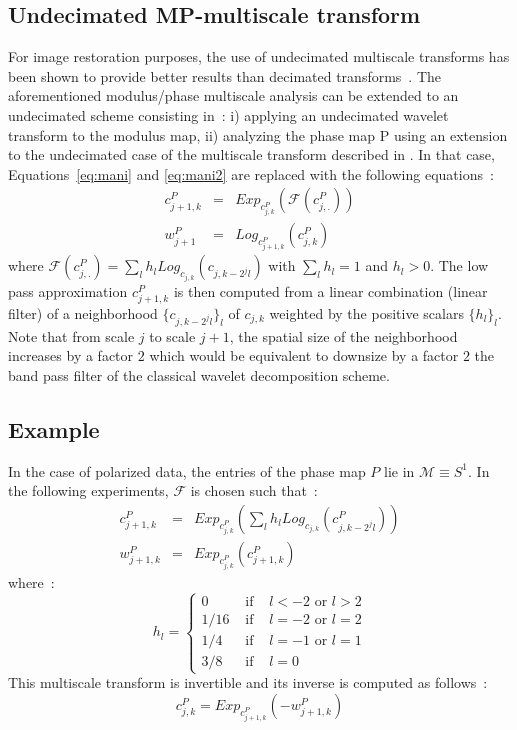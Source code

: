 \subsection{Undecimated MP-multiscale transform}
For image restoration purposes, the use of undecimated multiscale transforms has been shown to provide better results than decimated transforms~\cite{starck:book98,starck:book06}. 
The aforementioned modulus/phase multiscale analysis can be extended to an undecimated scheme consisting in~: i) applying an undecimated wavelet transform to the modulus map, 
ii) analyzing the phase map P using an extension to the undecimated case of the multiscale transform described in \cite{rahman05}. In that case, Equations~\eqref{eq:mani} 
and \eqref{eq:mani2} are replaced with the following equations~:
\begin{eqnarray}\label{eq:maniu}
c_{j+1,k}^P & = & Exp_{c_{j,k}^P} ( \mathcal{F}(c_{j,.}^P))\\
w_{j+1}^P & = & Log_{c_{j+1,k}^P}\left(c_{j,k}^P\right)  
\end{eqnarray}
where $\mathcal{F}(c_{j,.}^P) = \sum_l h_{l} Log_{c_{j,k}}\left(c_{j,k-2^jl}\right)$ with $\sum_l h_l = 1$ and $h_l > 0$. The low pass 
approximation $c_{j+1,k}^P$ is then computed from a linear combination (linear filter) of a neighborhood $\{c_{j,k-2^jl}\}_l$ of $c_{j,k}$ 
weighted by the positive scalars $\{h_l\}_l$. Note that from scale $j$ to scale $j+1$, the spatial size of the neighborhood increases 
by a factor $2$ which would be equivalent to downsize by a factor $2$ the band pass filter of the classical wavelet decomposition scheme.\\

\subsection{Example}
In the case of polarized data, the entries of the phase map $P$ lie in $\mathcal{M} \equiv S^1$. In the following experiments, $\mathcal{F}$ is chosen such that~:
\begin{eqnarray}
c_{j+1,k}^P & = & Exp_{c_{j,k}^P}\left(\sum_l h_{l}Log_{c_{j,k}}\left(c_{j,k-2^jl}^P\right)\right)  \\
w_{j+1,k}^P & = & Exp_{c_{j,k}^P} \left(c_{j+1,k}^P\right)
\end{eqnarray}
where~:
\begin{equation}
h_l = \left\{
\begin{array}{ccc}
0 & \mbox{ if } & l < -2 \mbox{ or } l > 2 \\
1/16 &\mbox{ if }& l=-2 \mbox{ or } l=2 \\
1/4 &\mbox{ if }& l=-1 \mbox{ or } l=1\\
3/8 &\mbox{ if }& l= 0
\end{array}
\right.
\end{equation}
This multiscale transform is invertible and its inverse is computed as follows~:
\begin{equation}
 c_{j,k}^P  =  Exp_{c_{j+1,k}^P } \left(- w_{j+1,k}^P\right)  
\end{equation}

